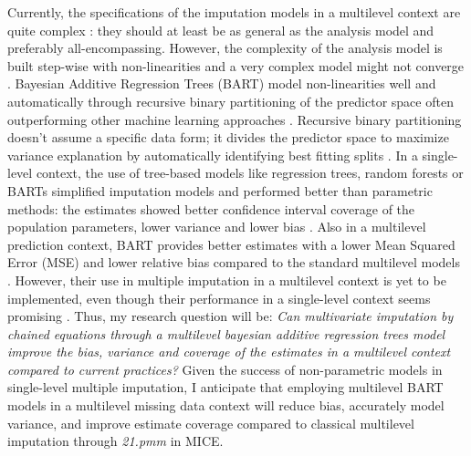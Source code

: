 \documentclass[10pt, a4paper, titlepage]{article}
\begin{document}
Currently, the specifications of the imputation models in a multilevel context are quite complex \cite{buurenFlexibleImputationMissing2018}: they should at least be as general as the analysis model \cite{grund2018} and preferably all-encompassing. However, the complexity of the analysis model is built step-wise with non-linearities \cite{hox2017} and a very complex model might not converge \cite{buurenFlexibleImputationMissing2018}. Bayesian Additive Regression Trees (BART) model non-linearities well and automatically through recursive binary partitioning of the predictor space often outperforming other machine learning approaches \cite{hill2020}. Recursive binary partitioning doesn’t assume a specific data form; it divides the predictor space to maximize variance explanation by automatically identifying best fitting splits \cite{hastie2017, james2021, salditt2023}. In a single-level context, the use of tree-based models like regression trees, random forests or BARTs simplified imputation models and performed better than parametric methods: the estimates showed better confidence interval coverage of the population parameters, lower variance and lower bias \cite{burgette2010, xu2016}. Also in a multilevel prediction context, BART provides better estimates with a lower Mean Squared Error (MSE) and lower relative bias compared to the standard multilevel models \cite{wagner2020, chen2020}. However, their use in multiple imputation in a multilevel context is yet to be implemented, even though their performance in a single-level context seems promising \cite{burgette2010, xu2016}. Thus, my research question will be: \textit{Can multivariate imputation by chained equations through a multilevel bayesian additive regression trees model improve the bias, variance and coverage of the estimates in a multilevel context compared to current practices?} Given the success of non-parametric models in single-level multiple imputation, I anticipate that employing multilevel BART models in a multilevel missing data context will reduce bias, accurately model variance, and improve estimate coverage compared to classical multilevel imputation through \textit{21.pmm} in MICE.
\end{document}
